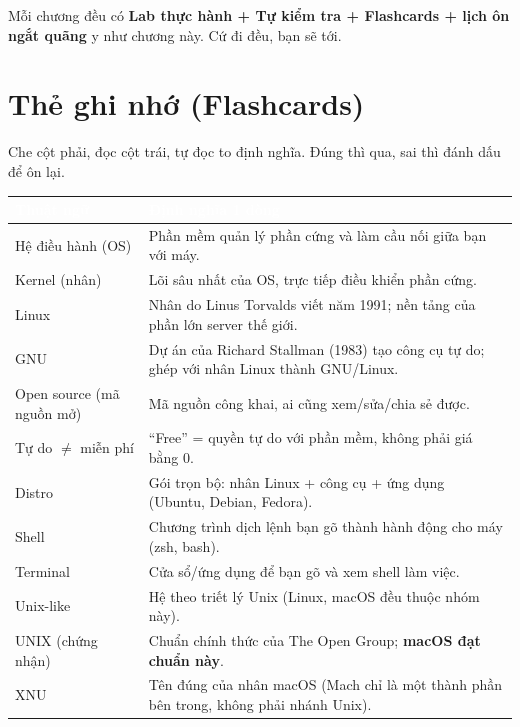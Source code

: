 \documentclass[12pt,a4paper]{article}
\begin{document}
Mỗi chương đều có \textbf{Lab thực hành + Tự kiểm tra + Flashcards + lịch ôn ngắt quãng} y như chương này. Cứ đi đều, bạn sẽ tới.

\section{Thẻ ghi nhớ (Flashcards)}

\begin{tipbox}
Che cột phải, đọc cột trái, tự đọc to định nghĩa. Đúng thì qua, sai thì đánh dấu để ôn lại.
\end{tipbox}

\renewcommand{\arraystretch}{1.35}
\begin{longtable}{>{\raggedright\arraybackslash}p{4.2cm}>{\raggedright\arraybackslash}p{10.3cm}}
\rowcolor{tblhead}\textcolor{white}{\textbf{Thuật ngữ}} & \textcolor{white}{\textbf{Định nghĩa 1 dòng}} \\
\endhead
\rowcolor{cardrow}Hệ điều hành (OS) & Phần mềm quản lý phần cứng và làm cầu nối giữa bạn với máy. \\
Kernel (nhân) & Lõi sâu nhất của OS, trực tiếp điều khiển phần cứng. \\
\rowcolor{cardrow}Linux & Nhân do Linus Torvalds viết năm 1991; nền tảng của phần lớn server thế giới. \\
GNU & Dự án của Richard Stallman (1983) tạo công cụ tự do; ghép với nhân Linux thành GNU/Linux. \\
\rowcolor{cardrow}Open source (mã nguồn mở) & Mã nguồn công khai, ai cũng xem/sửa/chia sẻ được. \\
Tự do $\neq$ miễn phí & ``Free'' = quyền tự do với phần mềm, không phải giá bằng 0. \\
\rowcolor{cardrow}Distro & Gói trọn bộ: nhân Linux + công cụ + ứng dụng (Ubuntu, Debian, Fedora). \\
Shell & Chương trình dịch lệnh bạn gõ thành hành động cho máy (zsh, bash). \\
\rowcolor{cardrow}Terminal & Cửa sổ/ứng dụng để bạn gõ và xem shell làm việc. \\
Unix-like & Hệ theo triết lý Unix (Linux, macOS đều thuộc nhóm này). \\
\rowcolor{cardrow}UNIX (chứng nhận) & Chuẩn chính thức của The Open Group; \textbf{macOS đạt chuẩn này}. \\
XNU & Tên đúng của nhân macOS (Mach chỉ là một thành phần bên trong, không phải nhánh Unix). \\

\end{longtable}
\end{document}
